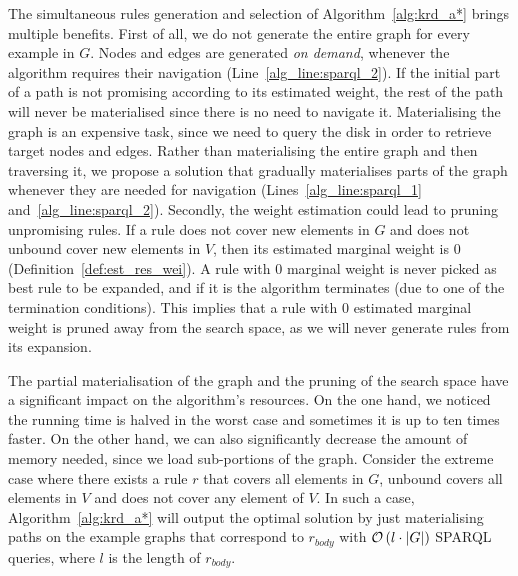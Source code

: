 The simultaneous rules generation and selection of Algorithm~\ref{alg:krd_a*} brings multiple benefits. First of all, we do not generate the entire graph for every example in $G$. Nodes and edges are generated \emph{on demand}, whenever the algorithm requires their navigation (Line~\ref{alg_line:sparql_2}). If the initial part of a path is not promising according to its estimated weight, the rest of the path will never be materialised since there is no need to navigate it. Materialising the graph is an expensive task, since we need to query the disk in order to retrieve target nodes and edges. Rather than materialising the entire graph and then traversing it, we propose a solution that gradually materialises parts of the graph whenever they are needed for navigation (Lines~\ref{alg_line:sparql_1} and~\ref{alg_line:sparql_2}). Secondly, the weight estimation could lead to pruning unpromising rules. If a rule does not cover new elements in $G$ and does not unbound cover new elements in $V$, then its estimated marginal weight is $0$ (Definition~\ref{def:est_res_wei}). A rule with $0$ marginal weight is never picked as best rule to be expanded, and if it is the algorithm terminates (due to one of the termination conditions). This implies that a rule with $0$ estimated marginal weight is pruned away from the search space, as we will never generate rules from its expansion.

The partial materialisation of the graph and the pruning of the search space have a significant impact on the algorithm's resources. On the one hand, we noticed the running time is halved in the worst case and sometimes it is up to ten times faster. On the other hand, we can also significantly decrease the amount of memory needed, since we load sub-portions of the graph. Consider the extreme case where there exists a rule $r$ that covers all elements in $G$, unbound covers all elements in $V$ and does not cover any element of $V$. In such a case, Algorithm~\ref{alg:krd_a*} will output the optimal solution by just materialising paths on the example graphs that correspond to $r_{body}$ with $\mathcal{O}\left(l \cdot |G|\right)$ SPARQL queries, where $l$ is the length of $r_{body}$.
